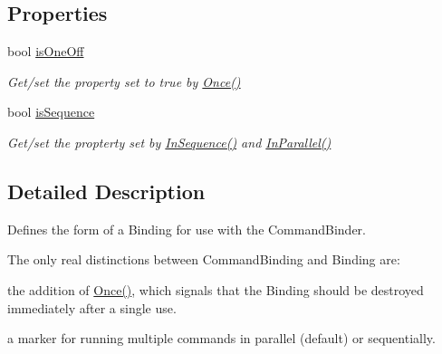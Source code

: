 \subsection*{Properties}
\begin{DoxyCompactItemize}
\item 
\hypertarget{interfacestrange_1_1extensions_1_1command_1_1api_1_1_i_command_binding_a624de4954de4f3517b1f4c6af11153ff}{bool \hyperlink{interfacestrange_1_1extensions_1_1command_1_1api_1_1_i_command_binding_a624de4954de4f3517b1f4c6af11153ff}{is\-One\-Off}}\label{interfacestrange_1_1extensions_1_1command_1_1api_1_1_i_command_binding_a624de4954de4f3517b1f4c6af11153ff}

\begin{DoxyCompactList}\small\item\em Get/set the property set to {\ttfamily true} by {\ttfamily \hyperlink{interfacestrange_1_1extensions_1_1command_1_1api_1_1_i_command_binding_a83a6c902c38775b55ba74e75807cd603}{Once()}} \end{DoxyCompactList}\item 
\hypertarget{interfacestrange_1_1extensions_1_1command_1_1api_1_1_i_command_binding_afde7b78ee9f21bb60c993b530bdf3aff}{bool \hyperlink{interfacestrange_1_1extensions_1_1command_1_1api_1_1_i_command_binding_afde7b78ee9f21bb60c993b530bdf3aff}{is\-Sequence}}\label{interfacestrange_1_1extensions_1_1command_1_1api_1_1_i_command_binding_afde7b78ee9f21bb60c993b530bdf3aff}

\begin{DoxyCompactList}\small\item\em Get/set the propterty set by \hyperlink{interfacestrange_1_1extensions_1_1command_1_1api_1_1_i_command_binding_a6cebcf5a61c1b6a8b3c90207be458c58}{In\-Sequence()} and \hyperlink{interfacestrange_1_1extensions_1_1command_1_1api_1_1_i_command_binding_acbaef737b3351ad56d071e214061af1d}{In\-Parallel()} \end{DoxyCompactList}\end{DoxyCompactItemize}


\subsection{Detailed Description}
Defines the form of a Binding for use with the Command\-Binder. 

The only real distinctions between Command\-Binding and Binding are\-:
\begin{DoxyItemize}
\item the addition of {\ttfamily \hyperlink{interfacestrange_1_1extensions_1_1command_1_1api_1_1_i_command_binding_a83a6c902c38775b55ba74e75807cd603}{Once()}}, which signals that the Binding should be destroyed immediately after a single use.
\item a marker for running multiple commands in parallel (default) or sequentially. 
\end{DoxyItemize}


